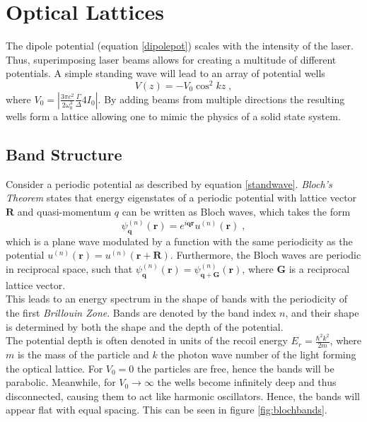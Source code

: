 \chapter{Optical Lattices}
The dipole potential (equation \ref{dipolepot}) scales with the intensity of the laser. Thus, superimposing laser beams allows for creating a multitude of different potentials. A simple standing wave will lead to an array of potential wells
\begin{equation}
	V(z) = - V_0 \cos^2{k z } \; ,
	\label{standwave}
\end{equation}
 where $V_0 = | \frac{3 \pi c^2}{2 \omega_{0}^3} \frac{\Gamma}{\Delta} 4 I_0 |$. By adding beams from multiple directions the resulting wells form a lattice allowing one to mimic the physics of a solid state system. 

\section{Band Structure}
Consider a periodic potential as described by equation \ref{standwave}. \textit{Bloch's Theorem} states that energy eigenstates of a periodic potential with lattice vector $\boldsymbol{R}$ and quasi-momentum $q$ can be written as Bloch waves, which takes the form
\begin{equation}
	\psi_{\boldsymbol{q}}^{(n)}(\boldsymbol{r}) = e^{i \boldsymbol{q} \boldsymbol{r}} u^{(n)}(\boldsymbol{r}) \; ,
\end{equation}
which is a plane wave modulated by a function with the same periodicity as the potential $u^{(n)}(\boldsymbol{r}) = u^{(n)}(\boldsymbol{r} + \boldsymbol{R})$. Furthermore, the Bloch waves are periodic in reciprocal space, such that $\psi_{\boldsymbol{q}}^{(n)}(\boldsymbol{r}) = \psi_{\boldsymbol{q} + \boldsymbol{G}}^{(n)}(\boldsymbol{r})$, where $\boldsymbol{G}$ is a reciprocal lattice vector. \cite{kittel} \\
This leads to an energy spectrum in the shape of bands with the periodicity of the first \textit{Brillouin Zone}. Bands are denoted by the band index $n$, and their shape is determined by both the shape and the depth of the potential.\\
The potential depth is often denoted in units of the recoil energy $E_r = \frac{\hbar ^2 k^2}{2 m}$, where $m$ is the mass of the particle and $k$ the photon wave number of the light forming the optical lattice. For $V_0 = 0$ the particles are free, hence the bands will be parabolic. Meanwhile, for $V_0 \rightarrow \infty$ the wells become infinitely deep and thus disconnected, causing them to act like harmonic oscillators. Hence, the bands will appear flat with equal spacing. This can be seen in figure \ref{fig:blochbands}.
